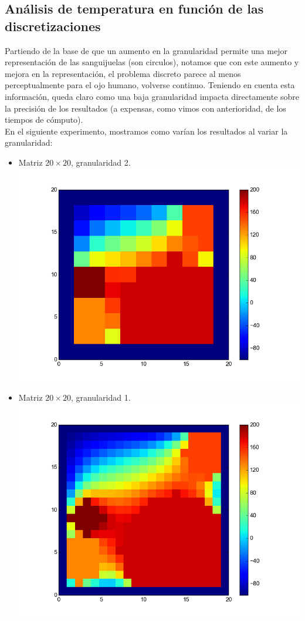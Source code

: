\subsection{Análisis de temperatura en función de las discretizaciones}
Partiendo de la base de que un aumento en la granularidad permite una mejor representación de las sanguijuelas (son circulos), notamos que con este aumento y mejora en la representación, el problema discreto parece al menos perceptualmente para el ojo humano, volverse continuo. Teniendo en cuenta esta información, queda claro como una baja granularidad impacta directamente sobre la precisión de los resultados (a expensas, como vimos con anterioridad, de los tiempos de cómputo).
\\
En el siguiente experimento, mostramos como varían los resultados al variar la granularidad:
\begin{itemize}
 \item Matriz $20 \times 20$, granularidad 2.\\
  \includegraphics[width=400pt]{imagenes/imagen11.png}

 \item Matriz $20 \times 20$, granularidad 1.\\
  \includegraphics[width=400pt]{imagenes/imagen21.png}


\end{itemize}
